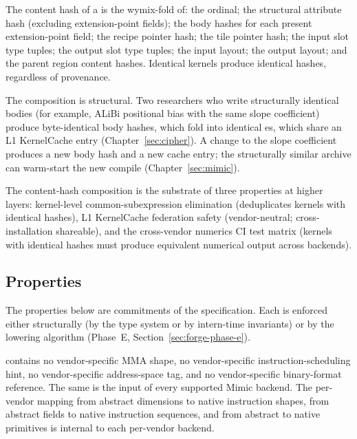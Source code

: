 \begin{property}
\label{prop:ir002-hash}
The content hash of a  is the wymix-fold of: the  ordinal; the structural attribute hash (excluding extension-point fields); the body hashes for each present extension-point field; the recipe pointer hash; the tile pointer hash; the input slot type tuples; the output slot type tuples; the input layout; the output layout; and the parent  region content hashes.
Identical kernels produce identical hashes, regardless of provenance.
\end{property}

The composition is structural.
Two researchers who write structurally identical  bodies (for example, ALiBi positional bias with the same slope coefficient) produce byte-identical body hashes, which fold into identical es, which share an L1 KernelCache entry (Chapter~\ref{sec:cipher}).
A change to the slope coefficient produces a new body hash and a new cache entry; the structurally similar archive can warm-start the new compile (Chapter~\ref{sec:mimic}).

The content-hash composition is the substrate of three properties at higher layers: kernel-level common-subexpression elimination (deduplicates kernels with identical hashes), L1 KernelCache federation safety (vendor-neutral; cross-installation shareable), and the cross-vendor numerics CI test matrix (kernels with identical hashes must produce equivalent numerical output across backends).

\subsection{Properties}
\label{sec:ir002-properties}

The properties below are commitments of the  specification.
Each is enforced either structurally (by the type system or by intern-time invariants) or by the lowering algorithm (Phase~E, Section~\ref{sec:forge-phase-e}).

\begin{property}
\label{prop:ir002-vendor-neutral}
 contains no vendor-specific MMA shape, no vendor-specific instruction-scheduling hint, no vendor-specific address-space tag, and no vendor-specific binary-format reference.
The same  is the input of every supported Mimic backend.
The per-vendor mapping from abstract  dimensions to native instruction shapes, from abstract  fields to native instruction sequences, and from abstract  to native primitives is internal to each per-vendor backend.
\end{property}

